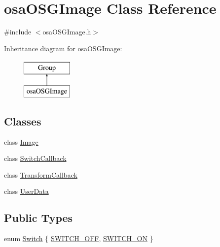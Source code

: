 \hypertarget{classosa_o_s_g_image}{\section{osa\-O\-S\-G\-Image Class Reference}
\label{classosa_o_s_g_image}
}


{\ttfamily \#include $<$osa\-O\-S\-G\-Image.\-h$>$}

Inheritance diagram for osa\-O\-S\-G\-Image\-:\begin{figure}[H]
\begin{center}
\leavevmode
\includegraphics[height=2.000000cm]{de/dae/classosa_o_s_g_image}
\end{center}
\end{figure}
\subsection*{Classes}
\begin{DoxyCompactItemize}
\item 
class \hyperlink{classosa_o_s_g_image_1_1_image}{Image}
\item 
class \hyperlink{classosa_o_s_g_image_1_1_switch_callback}{Switch\-Callback}
\item 
class \hyperlink{classosa_o_s_g_image_1_1_transform_callback}{Transform\-Callback}
\item 
class \hyperlink{classosa_o_s_g_image_1_1_user_data}{User\-Data}
\end{DoxyCompactItemize}
\subsection*{Public Types}
\begin{DoxyCompactItemize}
\item 
enum \hyperlink{classosa_o_s_g_image_a2da87cd46b5af72c4a2d1b1a97122d01}{Switch} \{ \hyperlink{classosa_o_s_g_image_a2da87cd46b5af72c4a2d1b1a97122d01a1340fd4d4a70cd80b1a5704db3b0adc7}{S\-W\-I\-T\-C\-H\-\_\-\-O\-F\-F}, 
\hyperlink{classosa_o_s_g_image_a2da87cd46b5af72c4a2d1b1a97122d01a4d07c9ccd9f97187e1d2a0cd7b01353b}{S\-W\-I\-T\-C\-H\-\_\-\-O\-N}
 \}
\end{DoxyCompactItemize}
